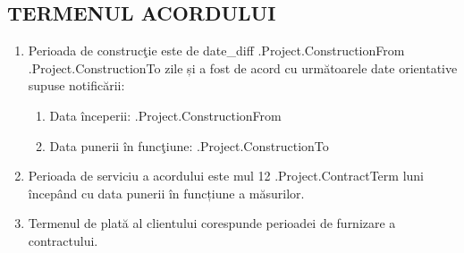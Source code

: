 \subsection{TERMENUL ACORDULUI}
\begin{enumerate}
	\item Perioada de construcţie este de {{date_diff .Project.ConstructionFrom .Project.ConstructionTo}} zile și a fost de acord cu următoarele date orientative supuse notificării:
	\begin{enumerate}
		\item Data începerii:                  \iffalse input project.construction_from value="{{.Project.ConstructionFrom}}" type="date" \fi {{.Project.ConstructionFrom}}
		\item Data punerii în funcţiune:       \iffalse input project.construction_to value="{{.Project.ConstructionTo}}" type="date" \fi {{.Project.ConstructionTo}}
	\end{enumerate}
	\item Perioada de serviciu a acordului este {{mul 12 .Project.ContractTerm}} luni începând cu data punerii în funcțiune a măsurilor.
	\item Termenul de plată al clientului corespunde perioadei de furnizare a contractului.
\end{enumerate}

